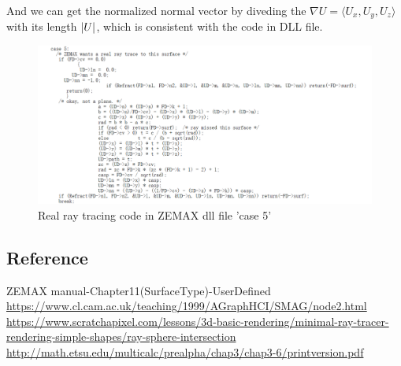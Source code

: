 \documentclass[../main.tex]{subfiles}
\begin{document}
	And we can get the normalized normal vector by diveding the $\nabla{U}=\langle U_x,U_y,U_z \rangle$ with its length $\left\lvert U\right\rvert$, which is consistent with the code in DLL file.
	\begin{figure}[h!]
	  \centering
	  \includegraphics[scale=0.6]{../graphics/Ray_tracing3.png}
	  \caption{Real ray tracing code in ZEMAX dll file 'case 5'}
	  \label{fig:realraytracing}
	\end{figure}
	\subsection{Reference}
	ZEMAX manual-Chapter11(SurfaceType)-UserDefined\\
	\url{https://www.cl.cam.ac.uk/teaching/1999/AGraphHCI/SMAG/node2.html}\\
	\url{https://www.scratchapixel.com/lessons/3d-basic-rendering/minimal-ray-tracer-rendering-simple-shapes/ray-sphere-intersection}\\
	\url{http://math.etsu.edu/multicalc/prealpha/chap3/chap3-6/printversion.pdf}



	
\end{document}
